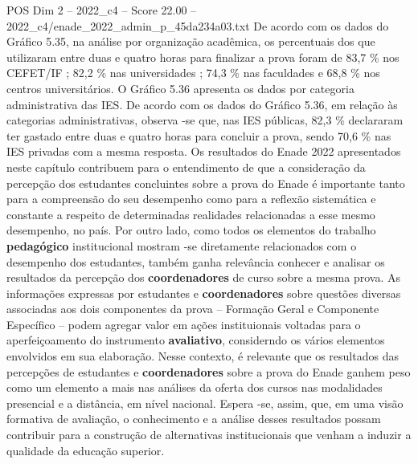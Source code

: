 \begin{textsample}{POS Dim 2 – 2022\_c4 – Score 22.00 – 2022\_c4/enade\_2022\_admin\_p\_45da234a03.txt}
De acordo com os dados do Gráfico 5.35, na análise por organização acadêmica, os percentuais dos que utilizaram entre duas e quatro horas para finalizar a prova foram de 83,7 \% nos CEFET/IF ; 82,2 \% nas universidades ; 74,3 \% nas faculdades e 68,8 \% nos centros universitários.
O Gráfico 5.36 apresenta os dados por categoria administrativa das IES.
De acordo com os dados do Gráfico 5.36, em relação às categorias administrativas, observa -se que, nas IES públicas, 82,3 \% declararam ter gastado entre duas e quatro horas para concluir a prova, sendo 70,6 \% nas IES privadas com a mesma resposta.
Os resultados do Enade 2022 apresentados neste capítulo contribuem para o entendimento de que a consideração da percepção dos estudantes concluintes sobre a prova do Enade é importante tanto para a compreensão do seu desempenho como para a reflexão sistemática e constante a respeito de determinadas realidades relacionadas a esse mesmo desempenho, no país.
Por outro lado, como todos os elementos do trabalho \textbf{pedagógico} institucional mostram -se diretamente relacionados com o desempenho dos estudantes, também ganha relevância conhecer e analisar os resultados da percepção dos \textbf{coordenadores} de curso sobre a mesma prova.
As informações expressas por estudantes e \textbf{coordenadores} sobre questões diversas associadas aos dois componentes da prova – Formação Geral e Componente Específico – podem agregar valor em ações instituionais voltadas para o aperfeiçoamento do instrumento \textbf{avaliativo}, considerndo os vários elementos envolvidos em sua elaboração.
Nesse contexto, é relevante que os resultados das percepções de estudantes e \textbf{coordenadores} sobre a prova do Enade ganhem peso como um elemento a mais nas análises da oferta dos cursos nas modalidades presencial e a distância, em nível nacional.
Espera -se, assim, que, em uma visão formativa de avaliação, o conhecimento e a análise desses resultados possam contribuir para a construção de alternativas institucionais que venham a induzir a qualidade da educação superior.

\end{textsample}
